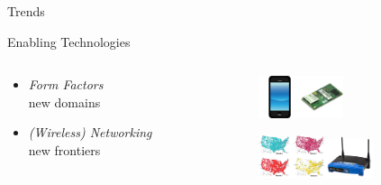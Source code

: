 \documentclass{beamer}
\begin{document}
\begin{frame}{Trends}

  \begin{block}{Enabling Technologies}

  \begin{columns}
    \begin{column}{.5\textwidth}
      \begin{itemize}
      \item \emph{Form Factors} \\ new domains
      \item \emph{(Wireless) Networking} \\ new frontiers
      \end{itemize}
    \end{column}
    \begin{column}{.5\textwidth}
      \centering

      \includegraphics[width=1.25cm]{smartphone.jpg}\includegraphics[width=1.25cm]{embedded.jpg}

      \vspace*{12pt}

      \includegraphics[height=1.25cm]{cellmap.jpg}\includegraphics[height=1.25cm]{wirelessrouter.jpg}





\end{column}
\end{columns}
\end{block}
\end{frame}
\end{document}
